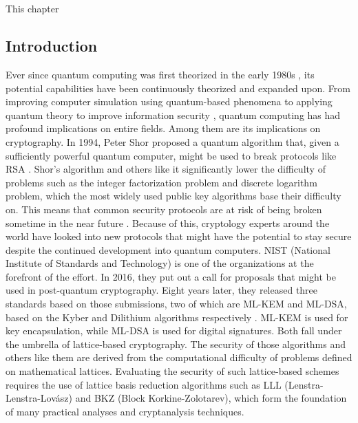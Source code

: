 \chapter{\babSatu}
\label{bab:1}
This chapter

\section{Introduction}
\label{sec:Introduction}
Ever since quantum computing was first theorized in the early 1980s \cite{benioff1980,benioff1982}, its potential capabilities have been continuously theorized and expanded upon. From improving computer simulation using quantum-based phenomena \cite{feynman1982} to applying quantum theory to improve information security \cite{bennett20147, brassard1543949}, quantum computing has had profound implications on entire fields. Among them are its implications on cryptography. In 1994, Peter Shor proposed a quantum algorithm that, given a sufficiently powerful quantum computer, might be used to break protocols like RSA \cite{shor365700}. Shor’s algorithm and others like it significantly lower the difficulty of problems such as the integer factorization problem and discrete logarithm problem, which the most widely used public key algorithms base their difficulty on. This means that common security protocols are at risk of being broken sometime in the near future \cite{meyer}. Because of this, cryptology experts around the world have looked into new protocols that might have the potential to stay secure despite the continued development into quantum computers.
NIST (National Institute of Standards and Technology) is one of the organizations at the forefront of the effort. In 2016, they put out a call for proposals that might be used in post-quantum cryptography. Eight years later, they released three standards based on those submissions, two of which are ML-KEM and ML-DSA, based on the Kyber and Dilithium algorithms respectively \cite{nistfips203,nistfips204}. ML-KEM is used for key encapsulation, while ML-DSA is used for digital signatures. Both fall under the umbrella of lattice-based cryptography.
The security of those algorithms and others like them are derived from the computational difficulty of problems defined on mathematical lattices. Evaluating the security of such lattice-based schemes requires the use of lattice basis reduction algorithms such as LLL (Lenstra-Lenstra-Lovász) and BKZ (Block Korkine-Zolotarev), which form the foundation of many practical analyses and cryptanalysis techniques.
